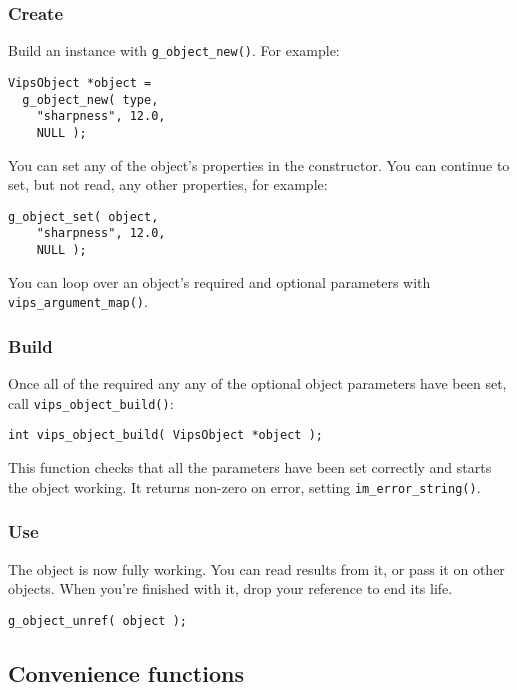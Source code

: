 \subsubsection{Create}

Build an instance with \verb+g_object_new()+. For example:

\begin{verbatim}
VipsObject *object =
  g_object_new( type,
    "sharpness", 12.0,
    NULL );
\end{verbatim}

You can set any of the object's properties in the constructor. You can
continue to set, but not read, any other properties, for example:

\begin{verbatim}
g_object_set( object,
    "sharpness", 12.0,
    NULL );
\end{verbatim}

You can loop over an object's required and optional parameters with
\verb+vips_argument_map()+.

\subsubsection{Build}

Once all of the required any any of the optional object parameters have been
set, call \verb+vips_object_build()+:

\begin{verbatim}
int vips_object_build( VipsObject *object );
\end{verbatim}

This function checks that all the parameters have been set correctly and
starts the object working. It returns non-zero on error, setting
\verb+im_error_string()+.

\subsubsection{Use}

The object is now fully working. You can read results from it, or pass it on 
other objects. When you're finished with it, drop your reference to end its
life.

\begin{verbatim}
g_object_unref( object );
\end{verbatim}

\subsection{Convenience functions}

